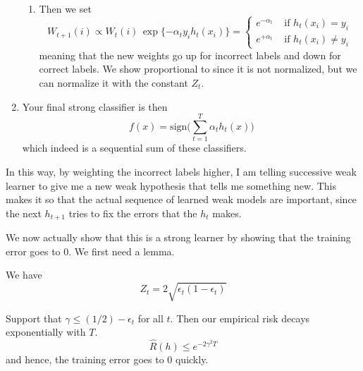 \documentclass{article}
\begin{document}
\begin{enumerate}
\begin{enumerate}
          \item Then we set 
            \begin{equation}
              W_{t + 1} (i) \propto W_t (i) \, \exp\{ - \alpha_t y_i h_t (x_i) \} = \begin{cases} 
                e^{-\alpha_t} & \text{ if } h_t(x_i) = y_i\\  
                e^{+\alpha_t} & \text{ if } h_t (x_i) \neq y_i
              \end{cases}
            \end{equation}
            meaning that the new weights go up for incorrect labels and down for correct labels. We show proportional to since it is not normalized, but we can normalize it with the constant $Z_t$. 
        \end{enumerate}

      \item Your final strong classifier is then 
        \begin{equation}
          f(x) = \mathrm{sign} \bigg( \sum_{t=1}^T \alpha_t h_t(x) \bigg)
        \end{equation}
        which indeed is a sequential sum of these classifiers. 
    \end{enumerate}

    In this way, by weighting the incorrect labels higher, I am telling successive weak learner to give me a new weak hypothesis that tells me something new. This makes it so that the actual sequence of learned weak models are important, since the next $h_{t+1}$ tries to fix the errors that the $h_t$ makes. 

    We now actually show that this is a strong learner by showing that the training error goes to $0$. We first need a lemma. 

    \begin{lemma} 
      We have 
      \begin{equation}
        Z_t = 2 \sqrt{\epsilon_t (1 - \epsilon_t)}
      \end{equation}
    \end{lemma}

    \begin{theorem}
      Support that $\gamma \leq (1/2) - \epsilon_t$ for all $t$. Then our empirical risk decays exponentially with $T$. 
      \begin{equation}
        \hat{R} (h) \leq e^{-2 \gamma^2 T}
      \end{equation}
      and hence, the training error goes to $0$ quickly. 
    \end{theorem}
\end{document}

